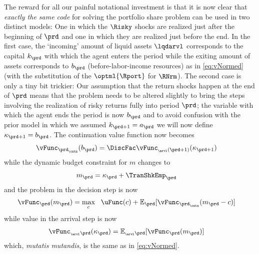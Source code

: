 The reward for all our painful notational investment is that it is now clear that \emph{exactly the same code} for solving the portfolio share problem can be used in two distinct models: One in which the $\Risky$ shocks are realized just after the beginning of $\prd$ and one in which they are realized just before the end. In the first case, the `incoming' amount of liquid assets $\lqdarvl$ corresponds to the capital $k_{\prd}$ with which the agent enters the period while the exiting amount of assets corresponds to $b_{\prd}$ (before-labor-income resources) as in \eqref{eq:vNormed} (with the substitution of the $\optml{\Rport}$ for $\RNrm$).  The second case is only a tiny bit trickier: Our assumption that the return shocks happen at the end of $\prd$ means that the problem needs to be altered slightly to bring the steps involving the realization of risky returns fully into period $\prd$; the variable with which the agent ends the period is now ${b}_{\prd}$ and to avoid confusion with the prior model in which we assumed ${k}_{\prd+1}={a}_{\prd}$ we will now define $\kappa_{\prd+1}={b}_{\prd}$.  The continuation value function now becomes
\begin{equation}\begin{gathered}\begin{aligned}
      \vFunc_{\prd_\cntn}({{b}}_{\prd}) & = \DiscFac \vFunc_{_\arvl(\prd+1)}({\kappa}_{\prd+1})
    \end{aligned}\end{gathered}\end{equation}
while the dynamic budget constraint for ${m}$ changes to
\begin{equation}\begin{gathered}\begin{aligned}
      {m}_{\prd} & = {\kappa}_{\prd}+\TranShkEmp_{\prd}
    \end{aligned}\end{gathered}\end{equation}
and the problem in the decision step is now
\begin{equation}\begin{gathered}\begin{aligned}
      \vFunc_{\prd}({m}_{\prd}) & = \max_{{c}}~~\uFunc({c})+\Ex_{\prd}[\vFunc_{\prd_\cntn}({m}_{\prd}-{{c}})]
    \end{aligned}\end{gathered}\end{equation}
while value in the arrival step is now
\begin{equation}\begin{gathered}\begin{aligned}
      \vFunc_{_\arvl\prd}({\kappa}_{\prd}) & = \Ex_{_\arvl\prd}[\vFunc_{\prd}({m}_{\prd})]
    \end{aligned}\end{gathered}\end{equation}
which, \textit{mutatis mutandis}, is the same as in \eqref{eq:vNormed}.

